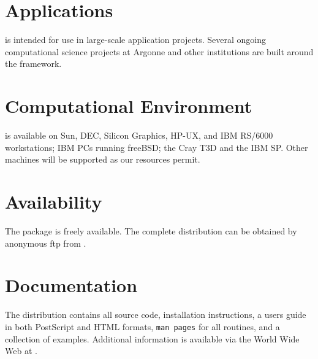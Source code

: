 \section*{Applications}
 is intended for use in large-scale application projects. 
Several ongoing computational science projects at Argonne and
other institutions are built around the  framework.

\section*{Computational Environment}
 is available on Sun, DEC, Silicon Graphics, HP-UX, and IBM
RS/6000 workstations; IBM PCs running freeBSD; the Cray T3D and the
IBM SP. Other machines will be supported as our resources permit.

\section*{Availability}

The  package is freely available.
The complete distribution can be obtained by anonymous ftp from 
.

\section*{Documentation}

The  distribution contains all source code, 
installation instructions,
a users guide in both PostScript and HTML formats, 
{\tt man pages} for all routines,
and a collection of examples.
Additional information is available via the World Wide Web at
.
\makeinfo

